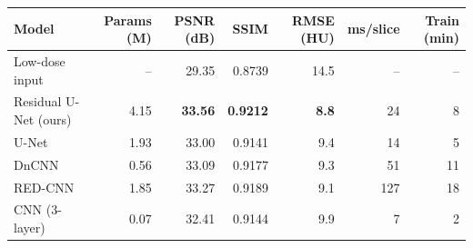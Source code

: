 \begin{tabular}{lrrrrrr}
\hline
Model & Params (M) & PSNR (dB) & SSIM & RMSE (HU) & ms/slice & Train (min) \\
\hline
Low-dose input & -- & 29.35 & 0.8739 & 14.5 & -- & -- \\
Residual U-Net (ours) & 4.15 & \textbf{33.56} & \textbf{0.9212} & \textbf{8.8} & 24 & 8 \\
U-Net & 1.93 & 33.00 & 0.9141 & 9.4 & 14 & 5 \\
DnCNN & 0.56 & 33.09 & 0.9177 & 9.3 & 51 & 11 \\
RED-CNN & 1.85 & 33.27 & 0.9189 & 9.1 & 127 & 18 \\
CNN (3-layer) & 0.07 & 32.41 & 0.9144 & 9.9 & 7 & 2 \\
\hline
\end{tabular}
